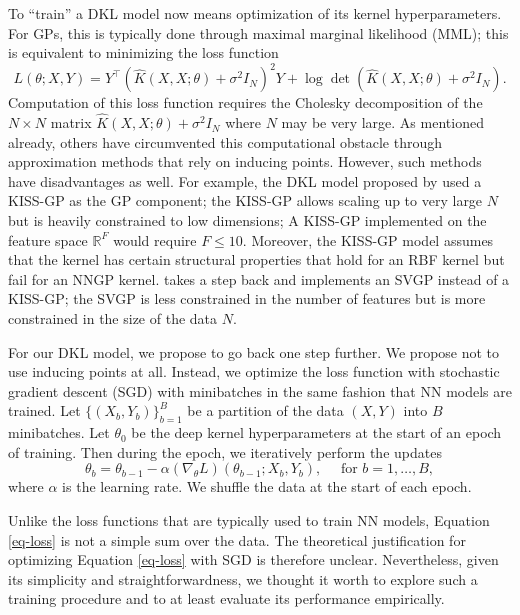\documentclass{article}
\newcommand{\RR}{\mathbb{R}}
\newcommand{\sig}{\sigma}
\begin{document}
To ``train'' a DKL model now means optimization of its kernel hyperparameters. For GPs, this is typically done through maximal marginal likelihood (MML); this is equivalent to minimizing the loss function
\begin{equation} \label{eq-loss}
L(\theta; X, Y) = Y^\top (\hat{K}(X, X; \theta) + \sig^2 I_N)^2 Y + \log\operatorname{det}(\hat{K}(X, X; \theta)+\sig^2 I_N).
\end{equation}
Computation of this loss function requires the Cholesky decomposition of the $N\times N$ matrix $\hat{K}(X, X; \theta)+\sig^2 I_N$ where $N$ may be very large. As mentioned already, others have circumvented this computational obstacle through approximation methods that rely on inducing points. However, such methods have disadvantages as well. For example, the DKL model proposed by \citet{wilson2016stochastic} used a KISS-GP as the GP component; the KISS-GP allows scaling up to very large $N$ but is heavily constrained to low dimensions; A KISS-GP implemented on the feature space $\RR^F$ would require $F\leq 10$. Moreover, the KISS-GP model assumes that the kernel has certain structural properties that hold for an RBF kernel but fail for an NNGP kernel. \citet{bradshaw2017adversarial} takes a step back and implements an SVGP instead of a KISS-GP; the SVGP is less constrained in the number of features but is more constrained in the size of the data $N$.

For our DKL model, we propose to go back one step further. We propose not to use inducing points at all. Instead, we optimize the loss function with stochastic gradient descent (SGD) with minibatches in the same fashion that NN models are trained. Let $\{(X_b, Y_b)\}_{b=1}^B$ be a partition of the data $(X, Y)$ into $B$ minibatches. Let $\theta_0$ be the deep kernel hyperparameters at the start of an epoch of training. Then during the epoch, we iteratively perform the updates
\begin{equation}
\theta_b = \theta_{b-1} - \alpha (\nabla_\theta L)(\theta_{b-1}; X_b, Y_b),
\quad \mbox{ for } b=1,\ldots,B,
\end{equation}
where $\alpha$ is the learning rate. We shuffle the data at the start of each epoch.

Unlike the loss functions that are typically used to train NN models, Equation \ref{eq-loss} is not a simple sum over the data. The theoretical justification for optimizing Equation \ref{eq-loss} with SGD is therefore unclear. Nevertheless, given its simplicity and straightforwardness, we thought it worth to explore such a training procedure and to at least evaluate its performance empirically.
\end{document}
